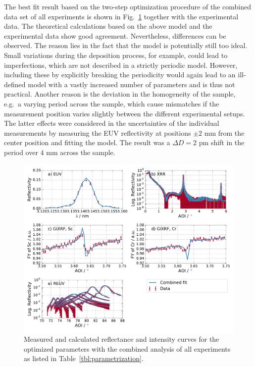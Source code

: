 The best fit result based on the two-step optimization procedure of the 
combined data set of all experiments is shown in 
Fig.~\ref{fig:combined_fit_result} together with the experimental data. The 
theoretical calculations based on the above model and the experimental data 
show good agreement. Nevertheless, differences can be observed. The reason lies 
in the fact that the model is potentially still too ideal. Small variations 
during the deposition process, for example, could lead to imperfections, which 
are not described in a strictly periodic model. However, including these by 
explicitly breaking the periodicity would again lead to an ill-defined model 
with a vastly increased number of parameters and is thus not practical. Another 
reason is the deviation in the homogeneity of the sample, e.g.~a varying period 
across the sample, which cause mismatches if the measurement position varies 
slightly between the different experimental setups. The latter effects were 
considered in the uncertainties of the individual measurements by measuring the 
EUV reflectivity at positions $\pm 2$ mm from the center position and fitting 
the model. The result was a $\Delta D = 2$ pm shift in the period over $4$ mm 
across the sample.
\onecolumn
\begin{figure}[htbp]
  \centering
  \includegraphics[width=\textwidth]{images/combined_fit_result}
  \caption{Measured and calculated reflectance and intensity curves for the 
optimized parameters with the combined analysis of all experiments as listed in 
Table~\ref{tbl:parametrization}.}
  \label{fig:combined_fit_result}
\end{figure}
